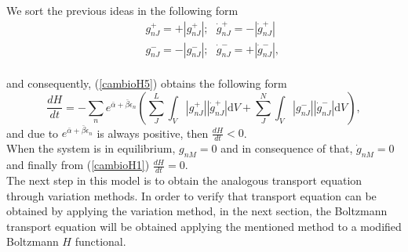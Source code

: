 \documentclass{article}
\begin{document}
We sort the previous ideas in the following form
\begin{eqnarray}
   &&g^{+}_{nJ}=+|g^{+}_{nJ}|; \ \ \  \dot{g}^{+}_{nJ}=-|\dot{g}^{+}_{nJ}| \nonumber \\
   &&g^{-}_{nJ}=-|g^{-}_{nJ}|; \ \ \ \dot{g}^{-}_{nJ}=+|\dot{g}^{-}_{nJ}| \label{separacion},
\end{eqnarray}{}
\\
and consequently, (\ref{cambioH5}) obtains the following form
\begin{equation}
    \frac{dH}{dt}=-\sum_n  e^{\bar{\alpha}+\bar{\beta}\epsilon_n}\left(\sum_J ^{L}\int_V |g^{+}_{nJ}||\dot{g}^{+}_{nJ}|\mathrm{d}V+\sum^{N}_J \int_V |g^{-}_{nJ}||\dot{g}^{-}_{nJ}|\mathrm{d}V \right), \label{cambioH6}
\end{equation}{}
and due to $e^{\bar{\alpha}+\bar{\beta}\epsilon_n}$ is always positive, then $\frac{dH}{dt}<0$.\\
When the system is in equilibrium, $g_{nM}=0$ and in consequence of that, $\dot g_{nM}=0$ and finally from (\ref{cambioH1}) $\frac{dH}{dt}=0$. 
\\
The next step in this model is to obtain the analogous transport equation through variation methods. In order to verify that transport equation can be obtained by applying the variation method, in the next section, the Boltzmann transport equation will be obtained applying the mentioned method to a modified Boltzmann $H$ functional.
\end{document}
